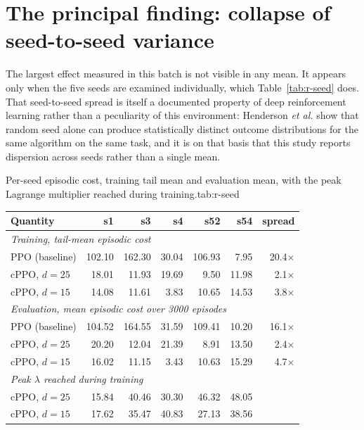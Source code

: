 \section{The principal finding: collapse of seed-to-seed variance}\label{sec:r-variance}

The largest effect measured in this batch is not visible in any mean. It appears only when the
five seeds are examined individually, which Table~\ref{tab:r-seed} does. That seed-to-seed
spread is itself a documented property of deep reinforcement learning rather than a peculiarity
of this environment: Henderson \emph{et al.} \cite{henderson2018matters} show that random seed
alone can produce statistically distinct outcome distributions for the same algorithm on the same
task, and it is on that basis that this study reports dispersion across seeds rather than a
single mean.

\begin{kuettable}{Per-seed episodic cost, training tail mean and evaluation mean, with the peak Lagrange multiplier reached during training.}{tab:r-seed}
\small\setlength{\tabcolsep}{5pt}
\begin{tabular*}{\textwidth}{@{\extracolsep{\fill}}lrrrrrr}
\toprule
Quantity & s1 & s3 & s4 & s52 & s54 & spread\\
\midrule
\multicolumn{7}{l}{\emph{Training, tail-mean episodic cost}}\\
PPO (baseline) & 102.10 & 162.30 & 30.04 & 106.93 & 7.95 & 20.4\(\times\)\\
cPPO, \(d=25\) & 18.01 & 11.93 & 19.69 & 9.50 & 11.98 & 2.1\(\times\)\\
cPPO, \(d=15\) & 14.08 & 11.61 & 3.83 & 10.65 & 14.53 & 3.8\(\times\)\\
\midrule
\multicolumn{7}{l}{\emph{Evaluation, mean episodic cost over 3000 episodes}}\\
PPO (baseline) & 104.52 & 164.55 & 31.59 & 109.41 & 10.20 & 16.1\(\times\)\\
cPPO, \(d=25\) & 20.20 & 12.04 & 21.39 & 8.91 & 13.50 & 2.4\(\times\)\\
cPPO, \(d=15\) & 16.02 & 11.15 & 3.43 & 10.63 & 15.29 & 4.7\(\times\)\\
\midrule
\multicolumn{7}{l}{\emph{Peak \(\lambda\) reached during training}}\\
cPPO, \(d=25\) & 15.84 & 40.46 & 30.30 & 46.32 & 48.05 & \\
cPPO, \(d=15\) & 17.62 & 35.47 & 40.83 & 27.13 & 38.56 & \\
\bottomrule
\end{tabular*}
\end{kuettable}

